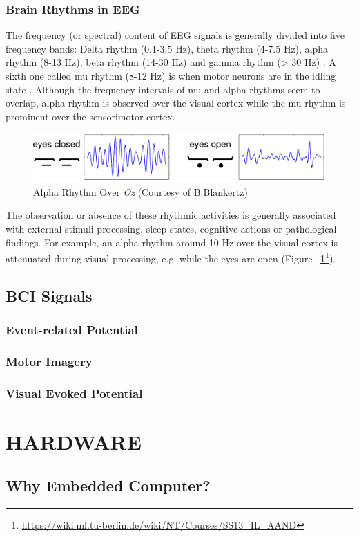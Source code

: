 \documentclass[12pt]{article}
\newcommand\mysection[1]{\vspace*{-0.35cm}\section{#1}\vspace*{6pt}\thispagestyle{empty}}
\newcommand\mysubsection[1]{\subsection{#1}}
\newcommand\mysubsubsection[1]{\subsubsection{#1}}
\numberwithin{equation}{section}
\numberwithin{figure}{section}
\numberwithin{table}{section}
\begin{document}
\mysubsubsection{Brain Rhythms in EEG}\label{seq:brain_rhythms}
\par{
    The frequency (or spectral) content of EEG signals is generally divided into five frequency
    bands: Delta rhythm (0.1-3.5 Hz), theta rhythm (4-7.5 Hz), alpha rhythm (8-13 Hz),
    beta rhythm (14-30 Hz) and gamma rhythm (> 30 Hz) \citep{niedermeyer_electroencephalography:_2005}.
    A sixth one called mu rhythm (8-12 Hz) is when motor neurons are in the idling
    state \citep{wang_practical_2010}. Although the frequency intervals of mu and
    alpha rhythms seem to overlap, alpha rhythm is observed over the visual cortex
    while the mu rhythm is prominent over the sensorimotor cortex.
}
    \par{
    \begin{figure}[ht]
        \centering
        \includegraphics[scale=0.8]{images/alpha_eyes}
        \caption[Alpha Rhythm Over Oz]{Alpha Rhythm Over \emph{Oz} (Courtesy of B.Blankertz)}
        \label{fig:eeg_alpha}
    \end{figure}

    The observation or absence of these rhythmic activities is generally associated
    with external stimuli processing, sleep states, cognitive actions or pathological
    findings. For example, an alpha rhythm around 10 Hz over the visual cortex
    is attenuated during visual processing, e.g. while the eyes are open (Figure ~\ref{fig:eeg_alpha}\footnote{\url{https://wiki.ml.tu-berlin.de/wiki/NT/Courses/SS13_IL_AAND}}).
}

\mysubsection{BCI Signals}\label{seq:bci_signals}
\mysubsubsection{Event-related Potential}\label{seq:bci_erp}
\par{
}
\mysubsubsection{Motor Imagery}\label{seq:bci_motor}
\mysubsubsection{Visual Evoked Potential}\label{seq:bci_vep}
\par{
}

\clearpage
\vspace*{-0.35cm}
\mysection{HARDWARE}\label{seq:hardware}

\mysubsection{Why Embedded Computer?}\label{seq:embeddedcomputer}
\end{document}
